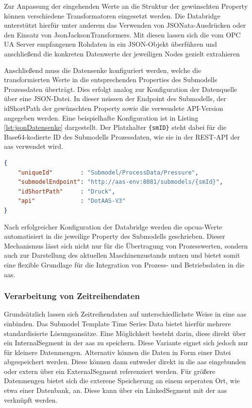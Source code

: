 Zur Anpassung der eingehenden Werte an die Struktur der gewünschten Property können verschiedene Transformatoren eingesetzt werden. 
Die Databridge unterstützt hierfür unter anderem das Verwenden von JSONata-Ausdrücken oder den Einsatz von JsonJacksonTransformers. 
Mit diesen lassen sich die vom OPC UA Server empfangenen Rohdaten in ein JSON-Objekt überführen und anschließend die konkreten Datenwerte der jeweiligen Nodes gezielt extrahieren

Anschließend muss die Datensenke konfiguriert werden, welche die transformierten Werte in die entsprechenden Properties des Submodells Prozessdaten überträgt.
Dies erfolgt analog zur Konfiguration der Datenquelle über eine JSON-Datei.
In dieser müssen der Endpoint des Submodells, der idShortPath der gewünschten Property sowie die verwendete API-Version angegeben werden.
Eine beispielhafte Konfiguration ist in Listing \ref{lst:jsonDatensenke} dargestellt.
Der Platzhalter \texttt{\{smID\}} steht dabei für die Base64-kodierte ID des Submodells Prozessdaten, wie sie in der REST-API der \acs{aas} verwendet wird.

\begin{lstlisting}[language=json, caption={Beispielhafte JSON-Konfiguration einer Datensenke}, label={lst:jsonDatensenke}]
{
    "uniqueId"        : "Submodel/ProcessData/Pressure",
    "submodelEndpoint": "http://aas-env:8081/submodels/{smId}",
    "idShortPath"     : "Druck",
    "api"             : "DotAAS-V3"
}
\end{lstlisting}

Nach erfolgreicher Konfiguration der Databridge werden die \acs{opcua}-Werte automatisiert in die jeweilige Property des Submodells geschrieben. 
Dieser Mechanismus lässt sich nicht nur für die Übertragung von Prozesswerten, sondern auch zur Darstellung des aktuellen Maschinenzustands nutzen und bietet somit eine flexible Grundlage für die Integration von Prozess- und Betriebsdaten in die \acs{aas}.

\subsubsection{Verarbeitung von Zeitreihendaten}

Grundsätzlich lassen sich Zeitreihendaten auf unterschiedlichste Weise in eine \acs{aas} einbinden.
Das Submodel Template Time Series Data \cite{SpezifikationTimeSeriesData} bietet hierfür mehrere standardisierte Lösungsansätze.
Eine Möglichkeit besteht darin, diese direkt über ein InternalSegment in der \acs{aas} zu speichern.
Diese Variante eignet sich jedoch nur für kleinere Datenmengen.
Alternativ können die Daten in Form einer Datei abgespeichert werden.
Diese können dann entweder direkt in die \acs{aas} eingebunden oder extern über ein ExternalSegment referenziert werden.
Für größere Datenmengen bietet sich die exterene Speicherung an einem seperaten Ort, wie etwa einer Datenbank, an.
Diese kann über ein LinkedSegment mit der \acs{aas} verknüpft werden.

